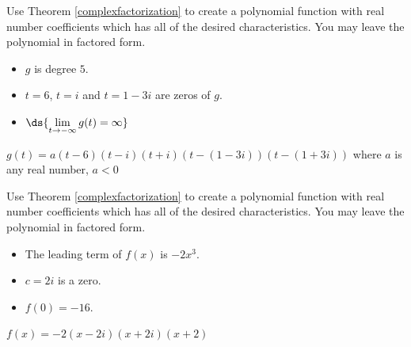 \documentclass{ximera}
\begin{document}
\begin{problem}
Use Theorem \ref{complexfactorization} to create a polynomial function with real number coefficients which has all of the desired characteristics.  You may leave the polynomial in factored form.

\begin{itemize}

\item $g$ is degree $5$.
\item $t=6$, $t = i$ and $t = 1-3i$ are zeros of $g$.
\item $\ds{\lim_{t \rightarrow -\infty} g(t) = \infty}$ 

\end{itemize}

\begin{solution}
$g(t) = a(t-6)(t-i)(t+i)(t-(1-3i))(t-(1+3i))$ where $a$ is any real number,  $a < 0$
\end{solution}
\end{problem}

\begin{problem}
Use Theorem \ref{complexfactorization} to create a polynomial function with real number coefficients which has all of the desired characteristics.  You may leave the polynomial in factored form.

\begin{itemize}

\item The leading term of $f(x)$ is $-2x^3$.
\item $c=2i$ is a zero.
\item $f(0) = -16$.

\end{itemize}

\begin{solution}
$f(x) = -2(x-2i)(x+2i)(x+2)$
\end{solution}
\end{problem}
\end{document}
